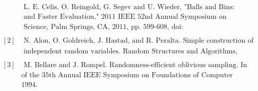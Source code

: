 \documentclass[a4paper, english]{paper}
\begin{document}
\begin{align*}
	[1]&\text{ L. E. Celis, O. Reingold, G. Segev and U. Wieder, "Balls and Bins: Smaller Hash Families}\\
	&\text{ and Faster Evaluation," 2011 IEEE 52nd Annual Symposium on Foundations of Computer }\\
	&\text{ Science, Palm Springs, CA, 2011, pp. 599-608, doi: 10.1109/FOCS.2011.49.}\\
&\\
	[2]&\text{ N. Alon, O. Goldreich, J. Hastad, and R. Peralta. Simple construction of almost kwise}\\
	&\text{ independent random variables. Random Structures and Algorithms, 3(3):289–304, 1992.}\\
&\\
	[3]&\text{ M. Bellare and J. Rompel. Randomness-efficient oblivious sampling. In Proceedings} \\
	&\text{of the 35th Annual IEEE Symposium on Foundations of Computer Science, pages 276–287,}\\
	&\text{1994.}
\end{align*}
\end{document}
